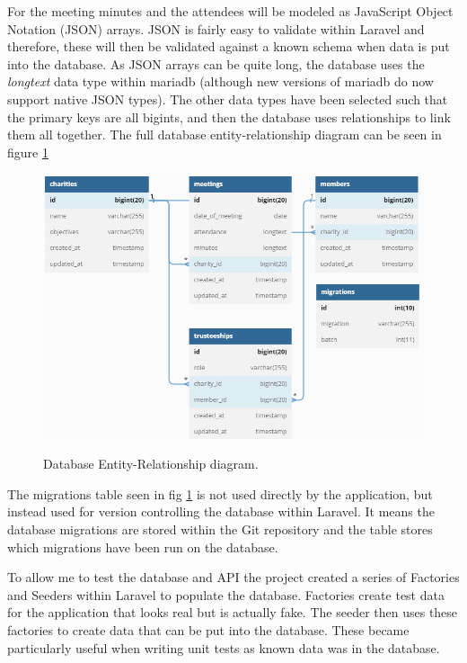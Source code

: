 \documentclass{UoYCSproject}
\begin{document}
For the meeting minutes and the attendees will be modeled as JavaScript Object Notation (JSON) arrays. JSON is fairly easy to validate within Laravel and therefore, these will then be validated against a known schema when data is put into the database. As JSON arrays can be quite long, the database uses the \textit{longtext} data type within mariadb (although new versions of mariadb do now support native JSON types). The other data types have been selected such that the primary keys are all bigints, and then the database uses relationships to link them all together. The full database entity-relationship diagram can be seen in figure \ref{fig:database}


\begin{figure}[htb]
\begin{center}
\includegraphics[width=\textwidth]{"./assets/implementation-assets/Database Diagram [Cropped].png"}
\label{fig:database}
\end{center}
\caption{Database Entity-Relationship diagram.}
\end{figure}

The migrations table seen in fig \ref{fig:database} is not used directly by the application, but instead used for version controlling the database within Laravel. It means the database migrations are stored within the Git repository and the table stores which migrations have been run on the database. 

To allow me to test the database and API the project created a series of Factories and Seeders within Laravel to populate the database. Factories create test data for the application that looks real but is actually fake. The seeder then uses these factories to create data that can be put into the database. These became particularly useful when writing unit tests as known data was in the database.
\end{document}
